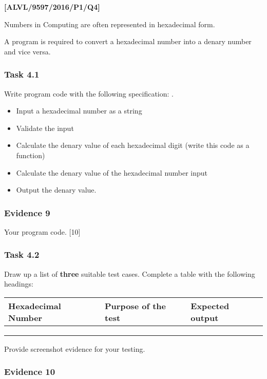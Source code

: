 \item \textbf{{[}ALVL/9597/2016/P1/Q4{]} }

Numbers in Computing are often represented in hexadecimal form. 

A program is required to convert a hexadecimal number into a denary
number and vice versa. 

\subsubsection*{Task 4.1}

Write program code with the following specification: .
\begin{itemize}
\item Input a hexadecimal number as a string 
\item Validate the input 
\item Calculate the denary value of each hexadecimal digit (write this code
as a function)
\item Calculate the denary value of the hexadecimal number input
\item Output the denary value. 
\end{itemize}

\subsubsection*{Evidence 9}

Your program code. \hfill{}{[}10{]}

\subsubsection*{Task 4.2}

Draw up a list of \textbf{three} suitable test cases. Complete a table
with the following headings: 
\begin{center}
\begin{tabular}{|l|l|l|}
\hline 
Hexadecimal Number & Purpose of the test & Expected output\tabularnewline
\hline 
 &  & \tabularnewline
\hline 
 &  & \tabularnewline
\hline 
 &  & \tabularnewline
\hline 
\end{tabular}
\par\end{center}

Provide screenshot evidence for your testing. 

\subsubsection*{Evidence 10}

